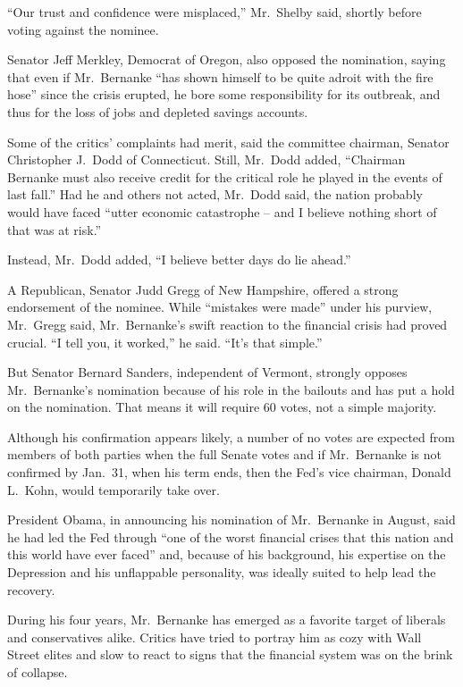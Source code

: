 ﻿\documentclass[12pt]{article}
\begin{document}
``Our trust and confidence were misplaced,'' Mr.~Shelby said, shortly before voting against the
nominee.

Senator Jeff Merkley, Democrat of Oregon, also opposed the nomination, saying that even if
Mr.~Bernanke ``has shown himself to be quite adroit with the fire hose'' since the crisis erupted,
he bore some responsibility for its outbreak, and thus for the loss of jobs and depleted savings
accounts.

Some of the critics' complaints had merit, said the committee chairman, Senator Christopher J.~Dodd
of Connecticut. Still, Mr.~Dodd added, ``Chairman Bernanke must also receive credit for the critical
role he played in the events of last fall.'' Had he and others not acted, Mr.~Dodd said, the nation
probably would have faced ``utter economic catastrophe -- and I believe nothing short of that was at
risk.''

Instead, Mr.~Dodd added, ``I believe better days do lie ahead.''

A Republican, Senator Judd Gregg of New Hampshire, offered a strong endorsement of the nominee.
While ``mistakes were made'' under his purview, Mr.~Gregg said, Mr.~Bernanke's swift reaction to the
financial crisis had proved crucial. ``I tell you, it worked,'' he said. ``It's that simple.''

But Senator Bernard Sanders, independent of Vermont, strongly opposes Mr.~Bernanke's nomination
because of his role in the bailouts and has put a hold on the nomination. That means it will require
60 votes, not a simple majority.

Although his confirmation appears likely, a number of no votes are expected from members of both
parties when the full Senate votes and if Mr.~Bernanke is not confirmed by Jan.~31, when his term
ends, then the Fed's vice chairman, Donald L.~Kohn, would temporarily take over.

President Obama, in announcing his nomination of Mr.~Bernanke in August, said he had led the Fed
through ``one of the worst financial crises that this nation and this world have ever faced'' and,
because of his background, his expertise on the Depression and his unflappable personality, was
ideally suited to help lead the recovery.

During his four years, Mr.~Bernanke has emerged as a favorite target of liberals and conservatives
alike. Critics have tried to portray him as cozy with Wall Street elites and slow to react to signs
that the financial system was on the brink of collapse.
\end{document}
